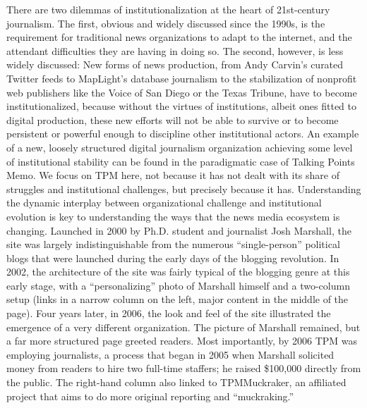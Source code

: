 There are two dilemmas of institutionalization at the heart of 21st-century journalism.
The first, obvious and widely discussed since the 1990s, is the requirement
for traditional news organizations to adapt to the internet, and the attendant difficulties
they are having in doing so. The second, however, is less widely discussed:
New forms of news production, from Andy Carvin’s curated Twitter feeds to
MapLight’s database journalism to the stabilization of nonprofit web publishers
like the Voice of San Diego or the Texas Tribune, have to become institutionalized,
because without the virtues of institutions, albeit ones fitted to digital production,
these new efforts will not be able to survive or to become persistent or
powerful enough to discipline other institutional actors.
An example of a new, loosely structured digital journalism organization achieving
some level of institutional stability can be found in the paradigmatic case
of Talking Points Memo. We focus on TPM here, not because it has not dealt
with its share of struggles and institutional challenges, but precisely because it
has. Understanding the dynamic interplay between organizational challenge
and institutional evolution is key to understanding the ways that the news
media ecosystem is changing. Launched in 2000 by Ph.D. student and journalist
Josh Marshall, the site was largely indistinguishable from the numerous
``single-person'' political blogs that were launched during the early days of the
blogging revolution.
In 2002, the architecture of the site was fairly typical of the blogging genre at this
early stage, with a ``personalizing'' photo of Marshall himself and a two-column
setup (links in a narrow column on the left, major content in the middle of the
page). Four years later, in 2006, the look and feel of the site illustrated the emergence
of a very different organization. The picture of Marshall remained, but a
far more structured page greeted readers.
Most importantly, by 2006 TPM was employing journalists, a process that began
in 2005 when Marshall solicited money from readers to hire two full-time staffers;
he raised \$100,000 directly from the public. The right-hand column also
linked to TPMMuckraker, an affiliated project that aims to do more original
reporting and ``muckraking.''

